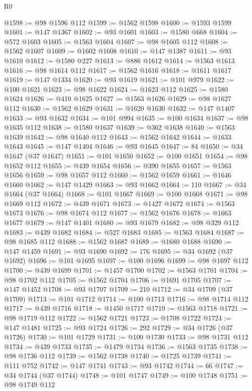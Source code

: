 \begin{lexlean}{R0}
\begin{coremodule}
@1598 := @98 @1596 @112
@1599 := @1562 @1598
@1600 := @1593 @1599
@1601 := @147 @1367
@1602 := @93 @1601
@1603 := @1580 @668
@1604 := @572 @1603
@1605 := @1563 @1604
@1607 := @98 @1605 @112
@1608 := @1562 @1607
@1609 := @1602 @1608
@1610 := @147 @1387
@1611 := @93 @1610
@1612 := @1580 @227
@1613 := @886 @1612
@1614 := @1563 @1613
@1616 := @98 @1614 @112
@1617 := @1562 @1616
@1618 := @1611 @1617
@1619 := @147 @1334
@1620 := @93 @1619
@1621 := @101 @979
@1622 := @100 @1621
@1623 := @98 @1622
@1624 := @1623 @112
@1625 := @1580 @1624
@1626 := @410 @1625
@1627 := @1563 @1626
@1629 := @98 @1627 @112
@1630 := @1562 @1629
@1631 := @1620 @1630
@1632 := @147 @1407
@1633 := @93 @1632
@1634 := @101 @994
@1635 := @100 @1634
@1637 := @98 @1635 @112
@1638 := @1580 @1637
@1639 := @362 @1638
@1640 := @1563 @1639
@1642 := @98 @1640 @112
@1643 := @1562 @1642
@1644 := @1633 @1643
@1645 := @147 @1404
@1646 := @93 @1645
@1647 := 84
@1650 := @34 @1647 (@37 @1647)
@1651 := @101 @1650
@1652 := @100 @1651
@1654 := @98 @1652 @112
@1655 := @439 @1654
@1656 := @390 @1655
@1657 := @1563 @1656
@1659 := @98 @1657 @112
@1660 := @1562 @1659
@1661 := @1646 @1660
@1662 := @147 @1429
@1663 := @93 @1662
@1664 := 110
@1667 := @34 @1664 (@37 @1664)
@1668 := @101 @1667
@1669 := @100 @1668
@1671 := @98 @1669 @112
@1672 := @439 @1671
@1673 := @1427 @1672
@1674 := @1563 @1673
@1676 := @98 @1674 @112
@1677 := @1562 @1676
@1678 := @1663 @1677
@1679 := @147 @1401
@1680 := @93 @1679
@1682 := @98 @329 @112
@1683 := @439 @1682
@1684 := @527 @1683
@1685 := @1563 @1684
@1687 := @98 @1685 @112
@1688 := @1562 @1687
@1689 := @1680 @1688
@1690 := @147 @1459
@1691 := @93 @1690
@1692 := 176
@1695 := @34 @1692 (@37 @1692)
@1696 := @101 @1695
@1697 := @100 @1696
@1699 := @98 @1697 @112
@1700 := @439 @1699
@1701 := @1457 @1700
@1702 := @1563 @1701
@1704 := @98 @1702 @112
@1705 := @1562 @1704
@1706 := @1691 @1705
@1707 := @147 @1452
@1708 := @93 @1707
@1709 := 210
@1712 := @34 @1709 (@37 @1709)
@1713 := @101 @1712
@1714 := @100 @1713
@1716 := @98 @1714 @112
@1717 := @439 @1716
@1718 := @1450 @1717
@1719 := @1563 @1718
@1721 := @98 @1719 @112
@1722 := @1562 @1721
@1723 := @1708 @1722
@1724 := @147 @1481
@1725 := @93 @1724
@1726 := 292
@1729 := @34 @1726 (@37 @1726)
@1730 := @101 @1729
@1731 := @100 @1730
@1733 := @98 @1731 @112
@1734 := @439 @1733
@1735 := @1479 @1734
@1736 := @1563 @1735
@1738 := @98 @1736 @112
@1739 := @1562 @1738
@1740 := @1725 @1739
@1741 := @111 @752
@1742 := @147 @1741
@1743 := @93 @1742
@1744 := 66
@1747 := @34 @1744 (@37 @1744)
@1748 := @101 @1747
@1749 := @100 @1748
@1751 := @98 @1749 @112

\end{coremodule}
\end{lexlean}
